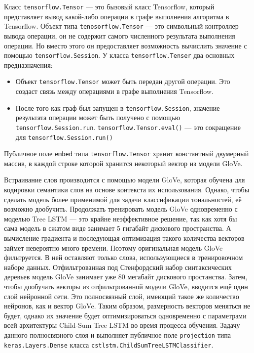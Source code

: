 Класс \texttt{tensorflow.Tensor} --- это бызовый класс Tensorflow, который представляет вывод какой-либо операции в графе выполнения алгоритма в Tensorflow. Объект типа \texttt{tenosorflow.Tensor} --- это символьный контроллер вывода операции, он не содержит самого численного результата выполнения операции. Но вместо этого он предоставляет возможность вычислить значение с помощью \texttt{tensorflow.Session}. У класса \texttt{tensorflow.Tenser} два основных предназначения:
\begin{itemize}
\item Объект \texttt{tensorflow.Tensor} может быть передан другой операции. Это создаст связь между операциями в графе выполнения Tensorflow.
\item После того как граф был запущен в \texttt{tensorflow.Session}, значение результата операции может быть получено с помощью \texttt{tensorflow.Sessi\-on.run}. \texttt{tensorflow.Tensor.eval()} --- это сокращение для \texttt{tensorflow.Ses\-sion.run()}
\end{itemize}

Публичное поле \texttt{embed} типа \texttt{tensorflow.Tensor} хранит константный двумерный массив, в каждой строке которой хранится некоторый вектор из модели GloVe.

Встраивание слов производится с помощью модели GloVe, которая обучена для кодировки семантики слов на основе контекста их использования. Однако, чтобы сделать модель более применимой для задачи классификации тональностей, её возможно дообучить. Продолжать тренировать модель GloVe одновременно с моделью Tree LSTM --- это крайне неэффективное решение, так как хотя бы сама модель в сжатом виде занимает 5 гигабайт дискового пространства. А вычисление градиента и последующая оптимизация такого количества векторов займет невероятно много времени. Поэтому оригинальная модель GloVe фильтруется. В ней оставляют только слова, использующиеся в тренировочном наборе данных. Отфильтрованная под Стенфордский набор синтаксических деревьев модель GloVe занимает уже 80 мегабайт дискового простанства. Затем, чтобы дообучать векторы из отфильтрованной модели GloVe, вводится ещё один слой нейронной сети. Это полносвязный слой, имеющий такое же количество нейронов, как и вектор GloVe. Таким образом, размерность векторов меняться не будет, однако их значение будет  оптимизироваться одновременно с параметрами всей архитектуры Child-Sum Tree LSTM во время процесса обучения. Задачу данного полносвязного слоя и выполняет публичное поле \texttt{projection} типа \texttt{keras.Layers.Dense} класса \texttt{cstlstm.ChildSumTreeLSTMClassifier}.

